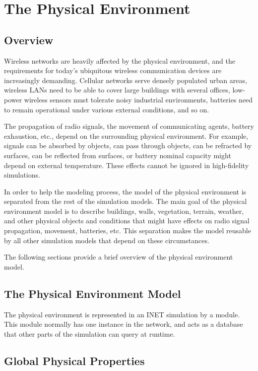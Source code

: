 \chapter{The Physical Environment}
\label{cha:environment}

\section{Overview}

Wireless networks are heavily affected by the physical environment, and the
requirements for today's ubiquitous wireless communication devices are
increasingly demanding. Cellular networks serve densely populated urban
areas, wireless LANs need to be able to cover large buildings with several
offices, low-power wireless sensors must tolerate noisy industrial
environments, batteries need to remain operational under various external
conditions, and so on.

The propagation of radio signals, the movement of communicating agents,
battery exhaustion, etc., depend on the surrounding physical environment.
For example, signals can be absorbed by objects, can pass through objects,
can be refracted by surfaces, can be reflected from surfaces, or battery
nominal capacity might depend on external temperature. These effects cannot
be ignored in high-fidelity simulations.

In order to help the modeling process, the model of the physical
environment is separated from the rest of the simulation models. The main
goal of the physical environment model is to describe buildings, walls,
vegetation, terrain, weather, and other physical objects and conditions
that might have effects on radio signal propagation, movement, batteries,
etc. This separation makes the model reusable by all other simulation
models that depend on these circumstances.

The following sections provide a brief overview of the physical environment
model.

\section{The Physical Environment Model}

The physical environment is represented in an INET simulation by a
 module. This module normally has one instance
in the network, and acts as a database that other parts of the simulation
can query at runtime.

\section{Global Physical Properties}

